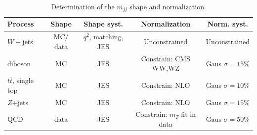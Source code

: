 \begin{table}[!ht]
  \begin{center}
 \caption{Determination of the $m_{jj}$ shape and normalization.}  
 \label{tab:mjj_shapes_and_normalization} 
 \begin{tabular} {l  c  c c c }
   \hline \hline
   Process                &    Shape                         &  Shape syst.           & Normalization   &  Norm. syst.\\  \hline
   $W+$jets               &    MC/ data                      &  $q^2$, matching, JES  & Unconstrained   &  Unconstrained \\
   diboson                &    MC                            &  JES                   & Constrain: CMS WW,WZ        &  Gaus $\sigma =15\%$ \\ 
   $t\bar{t}$, single top &    MC                            &  JES                   & Constrain: NLO        &  Gaus $\sigma =10\%$  \\ 
   $Z$+jets               &    MC                            &  JES                   & Constrain: NLO        &  Gaus $\sigma =15\%$  \\
   QCD                    &    data                          &  JES                   & Constrain: $m_T$ fit in data  &  Gaus $\sigma =50\%$  \\\hline \hline
 \end{tabular}
\end{center}
\end{table}
